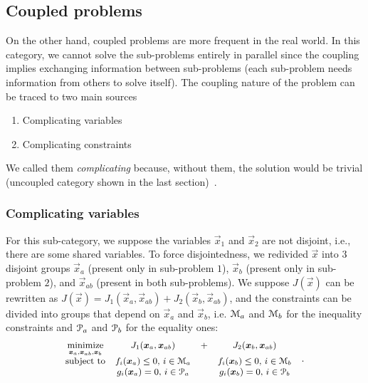 \documentclass[../main.tex]{subfiles}
\begin{document}
\subsection{Coupled problems}\label{sec:coupled_problems}
On the other hand, coupled problems are more frequent in the real world.
In this category, we cannot solve the sub-problems
entirely in parallel since the coupling implies exchanging information between sub-problems (each sub-problem needs information from others to solve itself).
The coupling nature of the problem can be traced to two main sources
\begin{enumerate}
  \item Complicating variables
  \item Complicating constraints
\end{enumerate}
We called them \emph{complicating} because, without them, the solution would be trivial (uncoupled category shown in the last section)~\cite{ConejoEtAl2006}.

\subsubsection{Complicating variables}
For this sub-category, we suppose the variables $\vec{x}_{1}$ and $\vec{x}_{2}$ are not disjoint, i.e., there are some shared variables.
To force disjointedness, we redivided $\vec{x}$ into $3$ disjoint groups $\vec{x}_{a}$ (present only in sub-problem $1$), $\vec{x}_{b}$ (present only in sub-problem $2$), and $\vec{x}_{ab}$ (present in both sub-problems).
We suppose $J(\vec{x})$ can be rewritten  as ${J(\vec{x})=J_{1}(\vec{x}_{a},\vec{x}_{ab})+J_{2}(\vec{x}_{b},\vec{x}_{ab})}$, and the constraints can be divided into groups that depend on $\vec{x}_{a}$ and $\vec{x}_{b}$, i.e. $\mathcal{M}_{a}$ and $\mathcal{M}_{b}$ for the inequality constraints and $\mathcal{P}_{a}$ and $\mathcal{P}_{b}$ for the equality ones:
\begin{equation}\label{eq:general_complicating_variables_optimization_problem}
  \small
  \begin{aligned}
    \begin{matrix}
      \mathop{\textrm{minimize}}\limits_{\boldsymbol{x}_{a},\boldsymbol{x}_{ab},\boldsymbol{x}_{b}}  &J_{1}(\boldsymbol{x}_{a},\boldsymbol{x}_{ab})&+&J_{2}(\boldsymbol{x}_{b},\boldsymbol{x}_{ab})&\\
      \mathrm{subject~ to} &

      f_{i}(\boldsymbol{x}_{a}) \leq 0 \text{, } i\in\mathcal{M}_{a} & & f_{i}(\boldsymbol{x}_{b}) \leq 0 \text{, } i\in\mathcal{M}_{b}\\
      & g_{i}(\boldsymbol{x}_{a}) = 0\text{, } i\in\mathcal{P}_{a}& & g_{i}(\boldsymbol{x}_{b}) = 0\text{, } i\in\mathcal{P}_{b}\\
    \end{matrix}
  \end{aligned}.
\end{equation}
\end{document}
